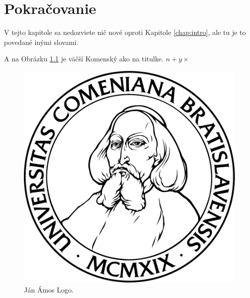 \chapter{Pokračovanie}\label{chap:dalej}

V tejto kapitole sa nedozviete nič nové oproti Kapitole \ref{chap:intro},
ale tu je to povedané inými slovami.

A na Obrázku \ref{img:komensky} je väčší Komenský ako na titulke.
$n+y\times$

\begin{figure}[!hbt]
\begin{center}
\includegraphics[width=1\textwidth]{komlogo-new}


\caption{Ján Ámos Logo.}
\label{img:komensky}
\end{center}
\end{figure}


